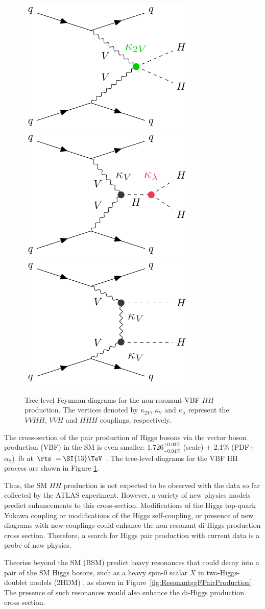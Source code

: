 \begin{figure}
\centering
\includegraphics[width=.3\textwidth]{figures/intro_diagrams/VBF_k2v.pdf}
\includegraphics[width=.3\textwidth]{figures/intro_diagrams/VBF_kvkl.pdf}
\includegraphics[width=.3\textwidth]{figures/intro_diagrams/VBF_kvkv.pdf}
\caption{Tree-level Feynman diagrams for the non-resonant VBF $HH$ production. The vertices denoted by $\kappa_{2V}$, $\kappa_{V}$ and $\kappa_{\lambda}$ represent the $VVHH$, $VVH$ and $HHH$ couplings, respectively.}
\label{fig:VBFfeynman}
\end{figure}

The cross-section of the pair production of Higgs bosons via the vector boson production (VBF) in the SM is even smaller: 1.726$^{+0.03\%}_{-0.04\%}$ (scale) $\pm$ 2.1\% (PDF+$\alpha_{\mathrm{S}}$)~fb at $\rts~= \SI{13} \TeV$ \cite{Dreyer_2018}. The tree-level diagrams for the VBF HH process are shown in Figure \ref{fig:VBFfeynman}.

Thus, the SM $HH$ production is not expected to be observed with the data so far collected by the ATLAS experiment.  However, a variety of new physics models predict enhancements to this cross-section. Modifications of the Higgs top-quark Yukawa coupling or modifications of the Higgs self-coupling, or presence of new diagrams with new couplings could enhance the non-resonant di-Higgs production cross section. Therefore, a search for Higgs pair production with current data is a probe of new physics. 

Theories beyond the SM (BSM) predict heavy resonances that could decay into a pair of the SM Higgs bosons, such as a heavy spin-0 scalar $X$ in two-Higgs-doublet models (2HDM) \cite{Branco:2011iw,}, as shown in Figure~\ref{fig:ResonantggFPairProduction}. The presence of such resonances would also enhance the di-Higgs production cross section.  %

